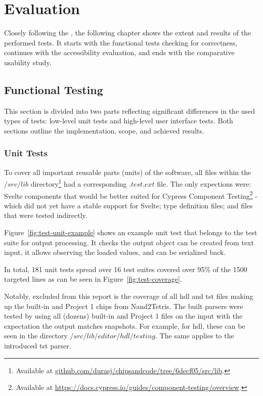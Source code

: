 \chapter{Evaluation}

Closely following the , the following chapter shows the extent and results of the performed tests.
It starts with the functional tests checking for correctness, continues with the accessibility evaluation, and ends with the comparative usability study.

\section{Functional Testing}
\label{Evaluation-Tests}

This section is divided into two parts reflecting significant differences in the used types of tests: low-level unit tests and high-level user interface tests.
Both sections outline the implementation, scope, and achieved results.

\subsection{Unit Tests}

To cover all important reusable parts (units) of the software, all files within the $/src/lib$ directory\footnote{Available at \href{https://github.com/durasj/chipsandcode/tree/6decf05115ba1d4ca927de42f63c8431b1ac3124/src/lib}{github.com/durasj/chipsandcode/tree/6decf05/src/lib}.} had a corresponding $.test.ext$ file.
The only expections were: Svelte components that would be better suited for Cypress Component Testing\footnote{Available at \url{https://docs.cypress.io/guides/component-testing/overview}.} - which did not yet have a stable support for Svelte; type definition files; and files that were tested indirectly.

Figure~\ref{fig:test-unit-example} shows an example unit test that belongs to the test suite for output processing.
It checks the output object can be created from text input, it allows observing the loaded values, and can be serialized back.

In total, 181 unit tests spread over 16 test suites covered over 95\% of the 1500 targeted lines as can be seen in Figure~\ref{fig:test-coverage}.

Notably, excluded from this report is the coverage of all \gls{hdl} and \gls{tst} files making up the built-in and Project 1 chips from Nand2Tetris.
The built parsers were tested by using all (dozens) built-in and Project 1 files on the input with the expectation the output matches snapshots.
For example, for \gls{hdl}, these can be seen in the directory $/src/lib/editor/hdl/testing$.
The same applies to the introduced \gls{tst} parser.

